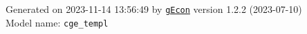 \documentclass[10pt,a4paper]{article}
\numberwithin{equation}{section}
\begin{document}
\begin{landscape}
\begin{flushleft}{\large
Generated  on 2023-11-14 13:56:49 by \href{http://gecon.r-forge.r-project.org/}{\texttt{gEcon}} version 1.2.2 (2023-07-10)\\
Model name: \verb+cge_templ+
}\end{flushleft}


\end{landscape}

\end{document}
